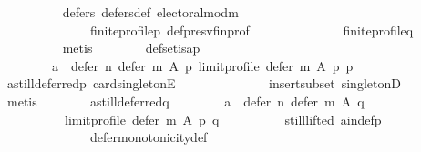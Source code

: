 \begin{isabellebody}
\ \ \ \ \ \ \ \ \isamarkupfalse%
\ defers{\isacharunderscore}{\kern0pt}{}\ defers{\isacharunderscore}{\kern0pt}def\ electoral{\isacharunderscore}{\kern0pt}mod{\isacharunderscore}{\kern0pt}m\isanewline
\ \ \ \ \ \ \ \ \ \ \ \ \ \ finite{\isacharunderscore}{\kern0pt}profile{\isacharunderscore}{\kern0pt}p\ def{\isacharunderscore}{\kern0pt}presv{\isacharunderscore}{\kern0pt}fin{\isacharunderscore}{\kern0pt}prof\isanewline
\ \ \ \ \ \ \ \ \ \ \ \ \ \ finite{\isacharunderscore}{\kern0pt}profile{\isacharunderscore}{\kern0pt}q\isanewline
\ \ \ \ \ \ \ \ \isamarkupfalse%
\ metis\isanewline
\ \ \ \ \ \ \isamarkupfalse%
\ def{\isacharunderscore}{\kern0pt}set{\isacharunderscore}{\kern0pt}is{\isacharunderscore}{\kern0pt}a{\isacharunderscore}{\kern0pt}p{\isacharcolon}{\kern0pt}\isanewline
\ \ \ \ \ \ \ \ {\isachardoublequoteopen}{\isacharbraceleft}{\kern0pt}a{\isacharbraceright}{\kern0pt}\ {\isacharequal}{\kern0pt}\ defer\ n\ {\isacharparenleft}{\kern0pt}defer\ m\ A\ p{\isacharparenright}{\kern0pt}\ {\isacharparenleft}{\kern0pt}limit{\isacharunderscore}{\kern0pt}profile\ {\isacharparenleft}{\kern0pt}defer\ m\ A\ p{\isacharparenright}{\kern0pt}\ p{\isacharparenright}{\kern0pt}{\isachardoublequoteclose}\isanewline
\ \ \ \ \ \ \ \ \isamarkupfalse%
\ a{\isacharunderscore}{\kern0pt}still{\isacharunderscore}{\kern0pt}deferred{\isacharunderscore}{\kern0pt}p\ card{\isacharunderscore}{\kern0pt}{}{\isacharunderscore}{\kern0pt}singletonE\isanewline
\ \ \ \ \ \ \ \ \ \ \ \ \ \ insert{\isacharunderscore}{\kern0pt}subset\ singletonD\isanewline
\ \ \ \ \ \ \ \ \isamarkupfalse%
\ metis\isanewline
\ \ \ \ \ \ \isamarkupfalse%
\ a{\isacharunderscore}{\kern0pt}still{\isacharunderscore}{\kern0pt}deferred{\isacharunderscore}{\kern0pt}q{\isacharcolon}{\kern0pt}\isanewline
\ \ \ \ \ \ \ \ {\isachardoublequoteopen}a\ {\isasymin}\ defer\ n\ {\isacharparenleft}{\kern0pt}defer\ m\ A\ q{\isacharparenright}{\kern0pt}\isanewline
\ \ \ \ \ \ \ \ \ \ {\isacharparenleft}{\kern0pt}limit{\isacharunderscore}{\kern0pt}profile\ {\isacharparenleft}{\kern0pt}defer\ m\ A\ p{\isacharparenright}{\kern0pt}\ q{\isacharparenright}{\kern0pt}{\isachardoublequoteclose}\isanewline
\ \ \ \ \ \ \ \ \isamarkupfalse%
\ still{\isacharunderscore}{\kern0pt}lifted\ a{\isacharunderscore}{\kern0pt}in{\isacharunderscore}{\kern0pt}def{\isacharunderscore}{\kern0pt}p\isanewline
\ \ \ \ \ \ \ \ \ \ \ \ \ \ defer{\isacharunderscore}{\kern0pt}monotonicity{\isacharunderscore}{\kern0pt}def\isanewline

\end{isabellebody}
